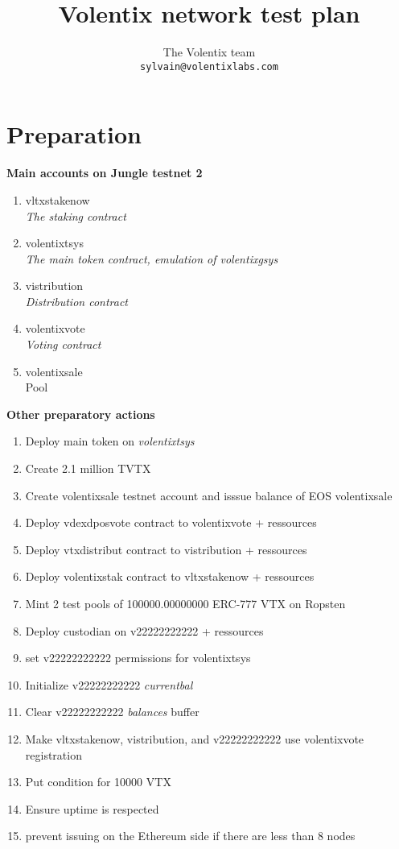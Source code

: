 \documentclass[]{article}
\title{Volentix network test plan}
\author{
		The Volentix team\\
	\texttt{sylvain@volentixlabs.com}
}
\begin{document}
\maketitle


\section{Preparation}

\textbf{Main accounts on Jungle testnet 2}
	
  \begin{enumerate}
  \item  vltxstakenow\\
\textit{  The staking contract}
  \item volentixtsys \\
  \textit{  The main token contract, emulation of volentixgsys}
  \item vistribution\\
  \textit{Distribution contract}
  \item volentixvote \\
  \textit{  Voting contract}
    \item volentixsale \\
		Pool
  
\end{enumerate}
 \textbf{Other preparatory actions}
  		\begin{enumerate}
  		  \item Deploy main token on \textit{volentixtsys}
  		  \item Create 2.1 million TVTX
  		  \item Create volentixsale testnet account and isssue balance of EOS volentixsale
  		  \item Deploy vdexdposvote contract to volentixvote + ressources
  		  \item Deploy vtxdistribut contract to vistribution + ressources
  		  \item Deploy volentixstak  contract to vltxstakenow + ressources
 		  \item Mint 2 test pools of 100000.00000000 ERC-777 VTX on Ropsten 
		  \item Deploy custodian on v22222222222 + ressources
		  \item set v22222222222 permissions for volentixtsys
		  \item Initialize v22222222222 \textit{currentbal}
		  \item Clear v22222222222 \textit{balances} buffer
		  \item Make vltxstakenow, vistribution, and v22222222222 use volentixvote registration
		  \item Put condition for 10000 VTX
		  \item Ensure uptime is respected 
		  \item prevent issuing on the Ethereum side if there are less than 8 nodes
		   
	 \end{enumerate}
\end{document}
